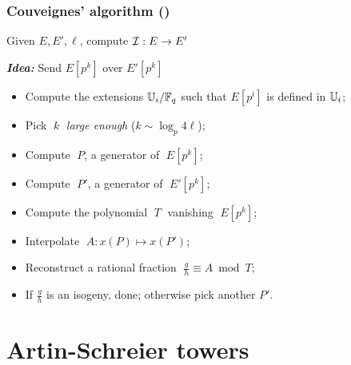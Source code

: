 \documentclass[10pt,usepdftitle=false]{beamer}
\begin{document}
\begin{frame}
  \frametitle{Couveignes' algorithm (\cite{couveignes96})}
  
  \begin{center}
    \large
    Given $E, E', \ell$, compute $\mathcal{I}:E\to E'$
  \end{center}

  \begin{center}
    \emph{\textbf{Idea:}} Send $E[p^k]$ over $E'[p^k]$
  \end{center}
  
  \begin{itemize}
  \item \alert<4>{Compute the extensions $\mathbb{U}_i/\mathbb{F}_q$
    such that $E[p^i]$ is defined in $\mathbb{U}_i$;}
    \hfill\emph{}
  \item Pick $\;k\;$ \emph{large enough} ($k\sim\log_p4\ell$);
  \item \alert<4>{Compute $\;P$, a generator of $\;E[p^k]$;}
    \hfill\emph{}
  \item \alert<4>{Compute $\;P'$, a generator of $\;E'[p^k]$;}
    \hfill\emph{}
  \item Compute the polynomial $\;T\;$ vanishing $\;E[p^k]$;
    \hfill\emph{}
  \item Interpolate $\;A : x(P) \mapsto x(P')$;
    \hfill\emph{}
  \item Reconstruct a rational fraction  $\;\frac{g}{h}\equiv A \bmod T$;
    \hfill\emph{}
  \item If $\frac{g}{h}$ is an isogeny, done; otherwise pick another $P'$.
    \hfill\emph{}
  \end{itemize}
\end{frame}



\section{Artin-Schreier towers}
\end{document}
